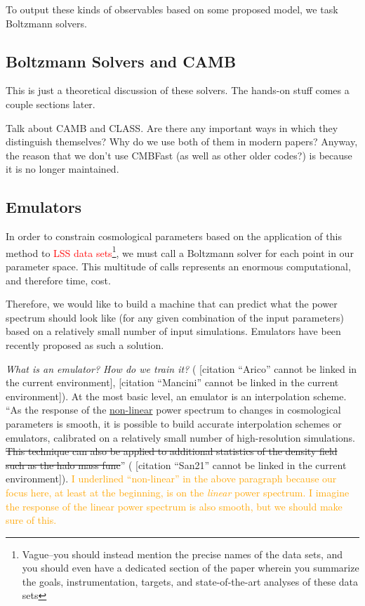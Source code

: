 \documentclass[11pt]{article}
\newcommand{\cbib}[1]
{\IfFileExists{biblatex.sty}
{\cite{#1}}
{[citation ``#1'' cannot be linked in the current environment]}}
\begin{document}
To output these kinds of observables based on some proposed model, we task
Boltzmann solvers.

\begin{centering}
\section{Boltzmann Solvers and CAMB}
\end{centering}

This is just a theoretical discussion of these solvers. The hands-on stuff
comes a couple sections later.

Talk about CAMB and CLASS. Are there any important ways in which they
distinguish themselves? Why do we use both of them in modern papers? Anyway,
the reason that we don't use CMBFast (as well as other older codes?) is
because it is no longer maintained.

\begin{centering}
\section{Emulators}
\end{centering}

In order to constrain cosmological parameters based on the application of this
method to \textcolor{red}{LSS data sets}\footnote{
	Vague--you should instead mention the precise names of the data sets,
	and you should even have a dedicated section of the paper wherein you
	summarize the goals, instrumentation, targets, and state-of-the-art
	analyses of these data sets
}, we must call a Boltzmann solver for each point in our parameter space. This
multitude of calls represents an enormous computational, and therefore time,
cost.

Therefore, we would like to build a machine that can predict what the power
spectrum should look like (for any given combination of the input parameters)
based on a relatively small number of input simulations. Emulators have been
recently  proposed as such a solution.

\textit{What is an emulator? How do we train it?}
(\cbib{Arico}, \cbib{Mancini}).
At the most basic level, an emulator is an interpolation scheme. ``As the
response of the \uline{non-linear} power spectrum to changes in cosmological
parameters
is smooth, it is possible to build accurate interpolation schemes or emulators,
calibrated on a relatively small number of high-resolution simulations. \sout{
This
technique can also be applied to additional statistics of the density field
such as the halo mass func}'' (\cbib{San21}).
\textcolor{orange}{I underlined ``non-linear'' in the above paragraph because
our focus here, at least at the beginning, is on the \textit{linear} power
spectrum. I imagine the response of the linear power spectrum is also smooth,
but we should make sure of this.}
\end{document}

